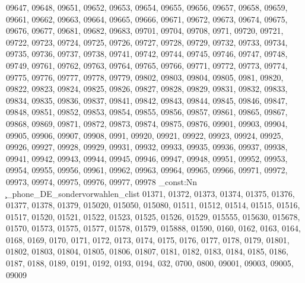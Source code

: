 {09647,
09648,
09651,
09652,
09653,
09654,
09655,
09656,
09657,
09658,
09659,
09661,
09662,
09663,
09664,
09665,
09666,
09671,
09672,
09673,
09674,
09675,
09676,
09677,
09681,
09682,
09683,
09701,
09704,
09708,
0971,
09720,
09721,
09722,
09723,
09724,
09725,
09726,
09727,
09728,
09729,
09732,
09733,
09734,
09735,
09736,
09737,
09738,
09741,
09742,
09744,
09745,
09746,
09747,
09748,
09749,
09761,
09762,
09763,
09764,
09765,
09766,
09771,
09772,
09773,
09774,
09775,
09776,
09777,
09778,
09779,
09802,
09803,
09804,
09805,
0981,
09820,
09822,
09823,
09824,
09825,
09826,
09827,
09828,
09829,
09831,
09832,
09833,
09834,
09835,
09836,
09837,
09841,
09842,
09843,
09844,
09845,
09846,
09847,
09848,
09851,
09852,
09853,
09854,
09855,
09856,
09857,
09861,
09865,
09867,
09868,
09869,
09871,
09872,
09873,
09874,
09875,
09876,
09901,
09903,
09904,
09905,
09906,
09907,
09908,
0991,
09920,
09921,
09922,
09923,
09924,
09925,
09926,
09927,
09928,
09929,
09931,
09932,
09933,
09935,
09936,
09937,
09938,
09941,
09942,
09943,
09944,
09945,
09946,
09947,
09948,
09951,
09952,
09953,
09954,
09955,
09956,
09961,
09962,
09963,
09964,
09965,
09966,
09971,
09972,
09973,
09974,
09975,
09976,
09977,
09978}
\clist_const:Nn \c_phone_DE_sondervorwahlen_clist {01371,
01372,
01373,
01374,
01375,
01376,
01377,
01378,
01379,
015020,
015050,
015080,
01511,
01512,
01514,
01515,
01516,
01517,
01520,
01521,
01522,
01523,
01525,
01526,
01529,
015555,
015630,
015678,
01570,
01573,
01575,
01577,
01578,
01579,
015888,
01590,
0160,
0162,
0163,
0164,
0168,
0169,
0170,
0171,
0172,
0173,
0174,
0175,
0176,
0177,
0178,
0179,
01801,
01802,
01803,
01804,
01805,
01806,
01807,
0181,
0182,
0183,
0184,
0185,
0186,
0187,
0188,
0189,
0191,
0192,
0193,
0194,
032,
0700,
0800,
09001,
09003,
09005,
09009}
